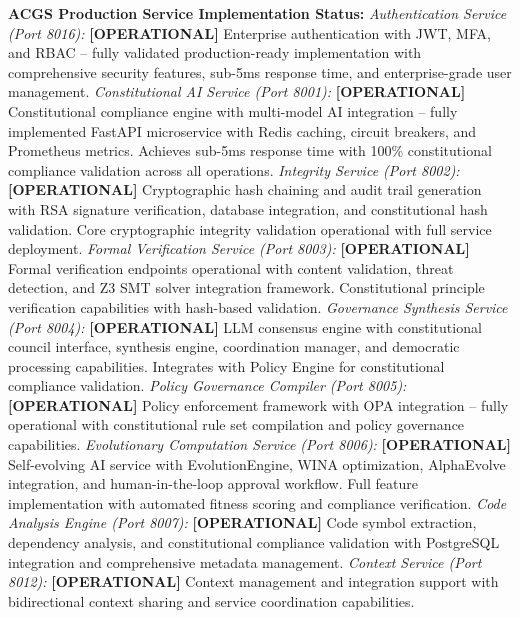 \documentclass[manuscript,screen,9pt]{acmart}
\begin{document}
\textbf{ACGS Production Service Implementation Status:}
\textit{Authentication Service (Port 8016):} \textbf{[OPERATIONAL]} Enterprise authentication with JWT, MFA, and RBAC -- fully validated production-ready implementation with comprehensive security features, sub-5ms response time, and enterprise-grade user management.
\textit{Constitutional AI Service (Port 8001):} \textbf{[OPERATIONAL]} Constitutional compliance engine with multi-model AI integration -- fully implemented FastAPI microservice with Redis caching, circuit breakers, and Prometheus metrics. Achieves sub-5ms response time with 100\% constitutional compliance validation across all operations.
\textit{Integrity Service (Port 8002):} \textbf{[OPERATIONAL]} Cryptographic hash chaining and audit trail generation with RSA signature verification, database integration, and constitutional hash validation. Core cryptographic integrity validation operational with full service deployment.
\textit{Formal Verification Service (Port 8003):} \textbf{[OPERATIONAL]} Formal verification endpoints operational with content validation, threat detection, and Z3 SMT solver integration framework. Constitutional principle verification capabilities with hash-based validation.
\textit{Governance Synthesis Service (Port 8004):} \textbf{[OPERATIONAL]} LLM consensus engine with constitutional council interface, synthesis engine, coordination manager, and democratic processing capabilities. Integrates with Policy Engine for constitutional compliance validation.
\textit{Policy Governance Compiler (Port 8005):} \textbf{[OPERATIONAL]} Policy enforcement framework with OPA integration -- fully operational with constitutional rule set compilation and policy governance capabilities.
\textit{Evolutionary Computation Service (Port 8006):} \textbf{[OPERATIONAL]} Self-evolving AI service with EvolutionEngine, WINA optimization, AlphaEvolve integration, and human-in-the-loop approval workflow. Full feature implementation with automated fitness scoring and compliance verification.
\textit{Code Analysis Engine (Port 8007):} \textbf{[OPERATIONAL]} Code symbol extraction, dependency analysis, and constitutional compliance validation with PostgreSQL integration and comprehensive metadata management.
\textit{Context Service (Port 8012):} \textbf{[OPERATIONAL]} Context management and integration support with bidirectional context sharing and service coordination capabilities.
\end{document}
